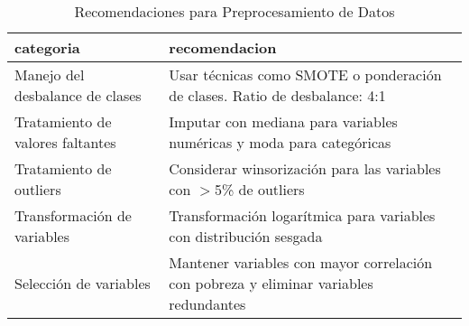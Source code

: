 \begin{table}[ht]
\centering
\begin{tabular}{ll}
  \toprule
categoria & recomendacion \\ 
  \midrule
Manejo del desbalance de clases & Usar técnicas como SMOTE o ponderación de clases. Ratio de desbalance: 4:1 \\ 
  Tratamiento de valores faltantes & Imputar con mediana para variables numéricas y moda para categóricas \\ 
  Tratamiento de outliers & Considerar winsorización para las variables con $>$5\% de outliers \\ 
  Transformación de variables & Transformación logarítmica para variables con distribución sesgada \\ 
  Selección de variables & Mantener variables con mayor correlación con pobreza y eliminar variables redundantes \\ 
   \bottomrule
\end{tabular}
\caption{Recomendaciones para Preprocesamiento de Datos} 
\label{tab:recomendaciones}
\end{table}
